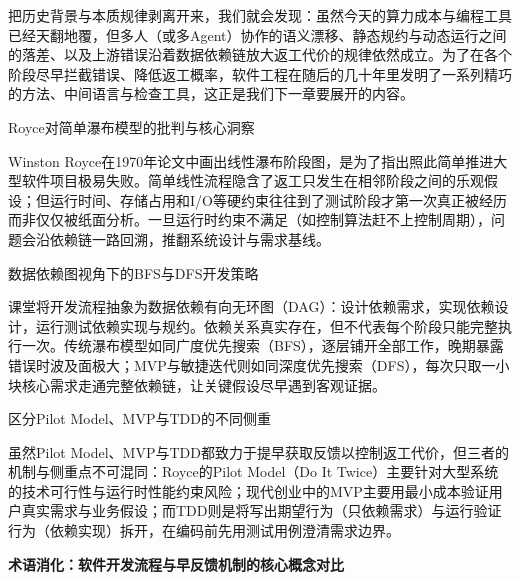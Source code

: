 \documentclass[UTF8,a4paper,11pt,fontset=fandol]{ctexart}
\begin{document}
把历史背景与本质规律剥离开来，我们就会发现：虽然今天的算力成本与编程工具已经天翻地覆，但多人（或多Agent）协作的语义漂移、静态规约与动态运行之间的落差、以及上游错误沿着数据依赖链放大返工代价的规律依然成立。为了在各个阶段尽早拦截错误、降低返工概率，软件工程在随后的几十年里发明了一系列精巧的方法、中间语言与检查工具，这正是我们下一章要展开的内容。

\begin{importantbox}{Royce对简单瀑布模型的批判与核心洞察}

Winston Royce在1970年论文中画出线性瀑布阶段图，是为了指出照此简单推进大型软件项目极易失败。简单线性流程隐含了返工只发生在相邻阶段之间的乐观假设；但运行时间、存储占用和I/O等硬约束往往到了测试阶段才第一次真正被经历而非仅仅被纸面分析。一旦运行时约束不满足（如控制算法赶不上控制周期），问题会沿依赖链一路回溯，推翻系统设计与需求基线。

\end{importantbox}

\begin{knowledgebox}{数据依赖图视角下的BFS与DFS开发策略}

课堂将开发流程抽象为数据依赖有向无环图（DAG）：设计依赖需求，实现依赖设计，运行测试依赖实现与规约。依赖关系真实存在，但不代表每个阶段只能完整执行一次。传统瀑布模型如同广度优先搜索（BFS），逐层铺开全部工作，晚期暴露错误时波及面极大；MVP与敏捷迭代则如同深度优先搜索（DFS），每次只取一小块核心需求走通完整依赖链，让关键假设尽早遇到客观证据。

\end{knowledgebox}

\begin{warningbox}{区分Pilot Model、MVP与TDD的不同侧重}

虽然Pilot Model、MVP与TDD都致力于提早获取反馈以控制返工代价，但三者的机制与侧重点不可混同：Royce的Pilot Model（Do It Twice）主要针对大型系统的技术可行性与运行时性能约束风险；现代创业中的MVP主要用最小成本验证用户真实需求与业务假设；而TDD则是将写出期望行为（只依赖需求）与运行验证行为（依赖实现）拆开，在编码前先用测试用例澄清需求边界。

\end{warningbox}

\par{}\textbf{术语消化：软件开发流程与早反馈机制的核心概念对比}
\end{document}
